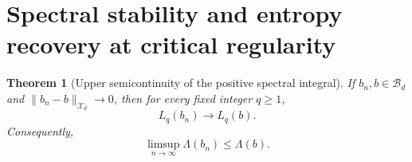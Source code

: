 \documentclass[review,12pt,times,a4paper,nopreprintline]{elsarticle}
\theoremstyle{plain}
\newtheorem{theorem}{Theorem}[section]
\theoremstyle{definition}
\theoremstyle{remark}
\newcommand{\B}{\mathscr B}
\newcommand{\X}{\mathscr X}
\numberwithin{equation}{section}
\begin{document}
\section{Spectral stability and entropy recovery at critical regularity}\label{sec:spectral}
\begin{theorem}[Upper semicontinuity of the positive spectral integral]\label{thm:spectral}
If $b_n,b\in\B_d$ and $\|b_n-b\|_{\X_d}\to0$, then for every fixed integer $q\geq1$,
\begin{equation}\label{eq:Lcont}
 L_q(b_n)\longrightarrow L_q(b).
\end{equation}
Consequently,
\begin{equation}\label{eq:spectralusc}
 \limsup_{n\to\infty}\Lambda(b_n)\leq\Lambda(b).
\end{equation}
\end{theorem}
\end{document}
